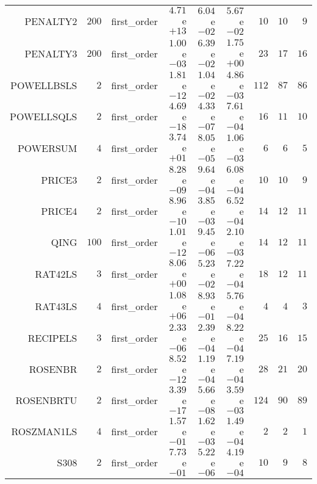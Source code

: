 \begin{longtable}{rrrrrrrrr}
PENALTY2 & \(   200\) & first\_order & \( 4.71\)e\(+13\) & \( 6.04\)e\(-02\) & \( 5.67\)e\(-02\) & \(    10\) & \(    10\) & \(     9\) \\
PENALTY3 & \(   200\) & first\_order & \( 1.00\)e\(-03\) & \( 6.39\)e\(-02\) & \( 1.75\)e\(+00\) & \(    23\) & \(    17\) & \(    16\) \\
POWELLBSLS & \(     2\) & first\_order & \( 1.81\)e\(-12\) & \( 1.04\)e\(-02\) & \( 4.86\)e\(-03\) & \(   112\) & \(    87\) & \(    86\) \\
POWELLSQLS & \(     2\) & first\_order & \( 4.69\)e\(-18\) & \( 4.33\)e\(-07\) & \( 7.61\)e\(-04\) & \(    16\) & \(    11\) & \(    10\) \\
POWERSUM & \(     4\) & first\_order & \( 3.74\)e\(+01\) & \( 8.05\)e\(-05\) & \( 1.06\)e\(-03\) & \(     6\) & \(     6\) & \(     5\) \\
PRICE3 & \(     2\) & first\_order & \( 8.28\)e\(-09\) & \( 9.64\)e\(-04\) & \( 6.08\)e\(-04\) & \(    10\) & \(    10\) & \(     9\) \\
PRICE4 & \(     2\) & first\_order & \( 8.96\)e\(-10\) & \( 3.85\)e\(-03\) & \( 6.52\)e\(-04\) & \(    14\) & \(    12\) & \(    11\) \\
QING & \(   100\) & first\_order & \( 1.01\)e\(-12\) & \( 9.45\)e\(-06\) & \( 2.10\)e\(-03\) & \(    14\) & \(    12\) & \(    11\) \\
RAT42LS & \(     3\) & first\_order & \( 8.06\)e\(+00\) & \( 5.23\)e\(-02\) & \( 7.22\)e\(-04\) & \(    18\) & \(    12\) & \(    11\) \\
RAT43LS & \(     4\) & first\_order & \( 1.08\)e\(+06\) & \( 8.93\)e\(-01\) & \( 5.76\)e\(-04\) & \(     4\) & \(     4\) & \(     3\) \\
RECIPELS & \(     3\) & first\_order & \( 2.33\)e\(-06\) & \( 2.39\)e\(-04\) & \( 8.22\)e\(-04\) & \(    25\) & \(    16\) & \(    15\) \\
ROSENBR & \(     2\) & first\_order & \( 8.52\)e\(-12\) & \( 1.19\)e\(-04\) & \( 7.19\)e\(-04\) & \(    28\) & \(    21\) & \(    20\) \\
ROSENBRTU & \(     2\) & first\_order & \( 3.39\)e\(-17\) & \( 5.66\)e\(-08\) & \( 3.59\)e\(-03\) & \(   124\) & \(    90\) & \(    89\) \\
ROSZMAN1LS & \(     4\) & first\_order & \( 1.57\)e\(-01\) & \( 1.62\)e\(-03\) & \( 1.49\)e\(-04\) & \(     2\) & \(     2\) & \(     1\) \\
S308 & \(     2\) & first\_order & \( 7.73\)e\(-01\) & \( 5.22\)e\(-06\) & \( 4.19\)e\(-04\) & \(    10\) & \(     9\) & \(     8\) \\

\end{longtable}
